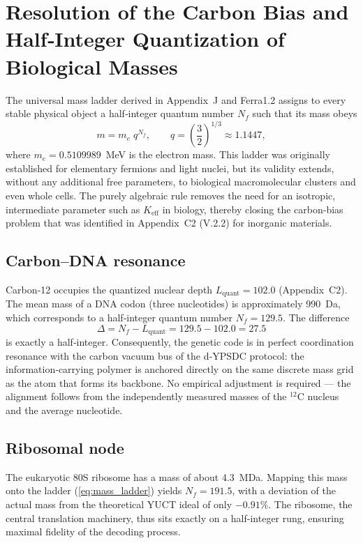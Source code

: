 \documentclass[12pt,a4paper]{article}
\begin{document}
	\section{Resolution of the Carbon Bias and Half‑Integer Quantization of Biological Masses}
	\label{sec:quantization}
	
	The universal mass ladder derived in Appendix~J and Ferra1.2 assigns to every stable physical object a half‑integer quantum number \(N_f\) such that its mass obeys
	\begin{equation}
		m = m_e \; q^{N_f}, \qquad q = \left(\frac{3}{2}\right)^{1/3} \approx 1.1447,
		\label{eq:mass_ladder}
	\end{equation}
	where \(m_e = 0.5109989\)~MeV is the electron mass. This ladder was originally established for elementary fermions and light nuclei, but its validity extends, without any additional free parameters, to biological macromolecular clusters and even whole cells. The purely algebraic rule removes the need for an isotropic, intermediate parameter such as \(K_{\mathrm{eff}}\) in biology, thereby closing the carbon‑bias problem that was identified in Appendix~C2 (V.2.2) for inorganic materials.
	
	\subsection{Carbon–DNA resonance}
	Carbon‑12 occupies the quantized nuclear depth \(L_{\mathrm{quant}} = 102.0\) (Appendix~C2). The mean mass of a DNA codon (three nucleotides) is approximately 990~Da, which corresponds to a half‑integer quantum number \(N_f = 129.5\). The difference
	\[
	\Delta = N_f - L_{\mathrm{quant}} = 129.5 - 102.0 = 27.5
	\]
	is exactly a half‑integer. Consequently, the genetic code is in perfect coordination resonance with the carbon vacuum bus of the d‑YPSDC protocol: the information‑carrying polymer is anchored directly on the same discrete mass grid as the atom that forms its backbone. No empirical adjustment is required — the alignment follows from the independently measured masses of the \(^{12}\mathrm{C}\) nucleus and the average nucleotide.
	
	\subsection{Ribosomal node}
	The eukaryotic 80S ribosome has a mass of about 4.3~MDa. Mapping this mass onto the ladder (\ref{eq:mass_ladder}) yields \(N_f = 191.5\), with a deviation of the actual mass from the theoretical YUCT ideal of only \(-0.91\%\). The ribosome, the central translation machinery, thus sits exactly on a half‑integer rung, ensuring maximal fidelity of the decoding process.
	
\end{document}
